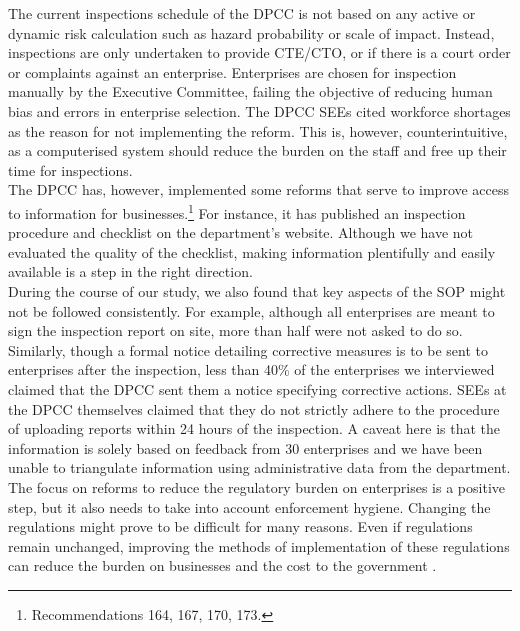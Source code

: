 \documentclass[a4paper, 12pt, twoside]{article}
\begin{document}
	The current inspections schedule of the DPCC is not based on any active or dynamic risk calculation such as hazard probability or scale of impact. Instead, inspections are only undertaken to provide CTE/CTO, or if there is a court order or complaints against an enterprise. Enterprises are chosen for inspection manually by the Executive Committee, failing the objective of reducing human bias and errors in enterprise selection. The DPCC SEEs cited workforce shortages as the reason for not implementing the reform. This is, however, counterintuitive, as a computerised system should reduce the burden on the staff and free up their time for inspections. \\
	
	The DPCC has, however, implemented some reforms that serve to improve access to information for businesses.\footnote{Recommendations 164, 167, 170, 173.} For instance, it has published an inspection procedure and checklist on the department’s website. Although we have not evaluated the quality of the checklist, making information plentifully and easily available is a step in the right direction. \\
	
	During the course of our study, we also found that key aspects of the SOP might not be followed consistently. For example, although all enterprises are meant to sign the inspection report on site, more than half were not asked to do so. Similarly, though a formal notice detailing corrective measures is to be sent to enterprises after the inspection, less than 40\% of the enterprises we interviewed claimed that the DPCC sent them a notice specifying corrective actions. SEEs at the DPCC themselves claimed that they do not strictly adhere to the procedure of uploading reports within 24 hours of the inspection. A caveat here is that the information is solely based on feedback from 30 enterprises and we have been unable to triangulate information using administrative data from the department. \\
	
	The focus on reforms to reduce the regulatory burden on enterprises is a positive step, but it also needs to take into account enforcement hygiene. Changing the regulations might prove to be difficult for many reasons. Even if regulations remain unchanged, improving the methods of implementation of these regulations can reduce the burden on businesses and the cost to the government \parencite{blancflorentin}. \\
	
\end{document}
